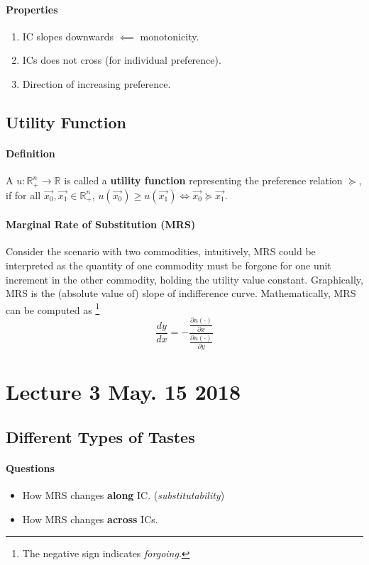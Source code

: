 \documentclass{article}
\begin{document}
\paragraph{Properties}
\begin{enumerate}
	\item IC slopes downwards $\impliedby$ monotonicity.
	\item ICs does not cross (for individual preference).
	\item Direction of increasing preference.
\end{enumerate}

\subsection{Utility Function}
\paragraph{Definition} A  $u: \mathbb{R}^n_{+} \to \mathbb{R}$ is called a \textbf{utility function} representing the preference relation $\succcurlyeq$, if for all $\vec{x_0}, \vec{x_1} \in \mathbb{R}^n_{+}$, $u(\vec{x_0}) \geq u(\vec{x_1}) \iff \vec{x_0} \succcurlyeq \vec{x_1}$.

\paragraph{Marginal Rate of Substitution (MRS)} Consider the scenario with two commodities, intuitively, MRS could be interpreted as the quantity of one commodity must be forgone for one unit increment in the other commodity, holding the utility value constant. Graphically, MRS is the (absolute value of) slope of indifference curve. Mathematically, MRS can be computed as \footnote{The negative sign indicates \emph{forgoing}.}
\[
	\frac{dy}{dx} = - \frac{\frac{\partial u(\cdot)}{\partial x}}{\frac{\partial u(\cdot)}{\partial y}}
\]

\section{Lecture 3 May. 15 2018}
\subsection{Different Types of Tastes}
\paragraph{Questions}
\begin{itemize}
	\item How MRS changes \textbf{along} IC. (\emph{substitutability})
	\item How MRS changes \textbf{across} ICs.
\end{itemize}
\end{document}
